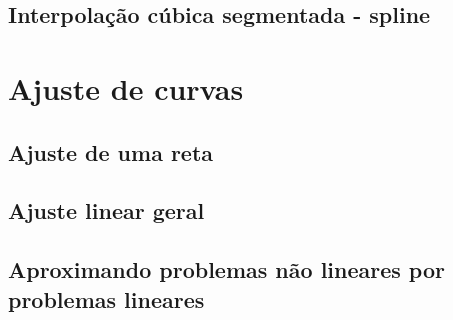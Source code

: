 \documentclass{article}
\theoremstyle{plain}
\theoremstyle{definition}
\theoremstyle{remark}
\begin{document}
\subsection{Interpolação cúbica segmentada - spline}

\section{Ajuste de curvas}

\subsection{Ajuste de uma reta}
\subsection{Ajuste linear geral}
\subsection{Aproximando problemas não lineares por problemas lineares}
\end{document}
